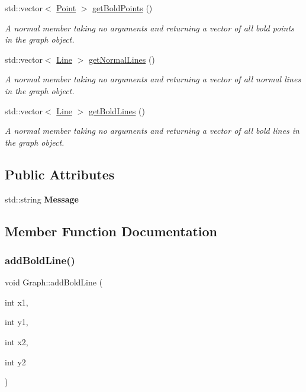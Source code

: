 \begin{DoxyCompactItemize}
std\+::vector$<$ \mbox{\hyperlink{struct_point}{Point}} $>$ \mbox{\hyperlink{class_graph_a67eada6ad6ec40b460f143d6abc96fdd}{get\+Bold\+Points}} ()
\begin{DoxyCompactList}\small\item\em A normal member taking no arguments and returning a vector of all bold points in the graph object. \end{DoxyCompactList}\item 
std\+::vector$<$ \mbox{\hyperlink{struct_line}{Line}} $>$ \mbox{\hyperlink{class_graph_a669b5fbc123b65cdbbf823ecb0b1f157}{get\+Normal\+Lines}} ()
\begin{DoxyCompactList}\small\item\em A normal member taking no arguments and returning a vector of all normal lines in the graph object. \end{DoxyCompactList}\item 
std\+::vector$<$ \mbox{\hyperlink{struct_line}{Line}} $>$ \mbox{\hyperlink{class_graph_a7c8d991dd598c2ba62cf82e21baab4d8}{get\+Bold\+Lines}} ()
\begin{DoxyCompactList}\small\item\em A normal member taking no arguments and returning a vector of all bold lines in the graph object. \end{DoxyCompactList}\end{DoxyCompactItemize}
\subsection*{Public Attributes}
\begin{DoxyCompactItemize}
\item 
\mbox{\label{class_graph_a21d63a3bcf713bcca967195b4510865b}} 
std\+::string {\bfseries Message}
\end{DoxyCompactItemize}


\subsection{Member Function Documentation}
\mbox{\label{class_graph_abe207827bee7e2be2cbce4ed24a7d10d}} 
\subsubsection{\texorpdfstring{addBoldLine()}{addBoldLine()}}
{\footnotesize\ttfamily void Graph\+::add\+Bold\+Line (\begin{DoxyParamCaption}\item[{int}]{x1,  }\item[{int}]{y1,  }\item[{int}]{x2,  }\item[{int}]{y2 }\end{DoxyParamCaption})}



